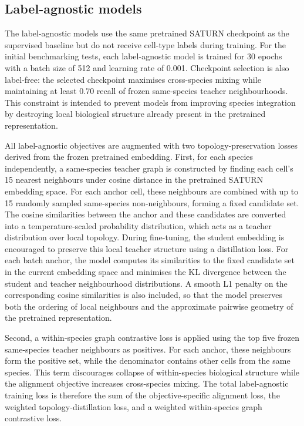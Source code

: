 \documentclass{article}
\begin{document}
\subsection{Label-agnostic models} \label{sec:models}
The label-agnostic models use the same pretrained SATURN checkpoint as the supervised baseline but do not receive cell-type labels during training. For the initial benchmarking tests, each label-agnostic model is trained for 30 epochs with a batch size of 512 and learning rate of 0.001. Checkpoint selection is also label-free: the selected checkpoint maximises cross-species mixing while maintaining at least 0.70 recall of frozen same-species teacher neighbourhoods. This constraint is intended to prevent models from improving species integration by destroying local biological structure already present in the pretrained representation.

All label-agnostic objectives are augmented with two topology-preservation losses derived from the frozen pretrained embedding. First, for each species independently, a same-species teacher graph is constructed by finding each cell's 15 nearest neighbours under cosine distance in the pretrained SATURN embedding space. For each anchor cell, these neighbours are combined with up to 15 randomly sampled same-species non-neighbours, forming a fixed candidate set. The cosine similarities between the anchor and these candidates are converted into a temperature-scaled probability distribution, which acts as a teacher distribution over local topology. During fine-tuning, the student embedding is encouraged to preserve this local teacher structure using a distillation loss. For each batch anchor, the model computes its similarities to the fixed candidate set in the current embedding space and minimises the KL divergence between the student and teacher neighbourhood distributions. A smooth L1 penalty on the corresponding cosine similarities is also included, so that the model preserves both the ordering of local neighbours and the approximate pairwise geometry of the pretrained representation.

Second, a within-species graph contrastive loss is applied using the top five frozen same-species teacher neighbours as positives. For each anchor, these neighbours form the positive set, while the denominator contains other cells from the same species. This term discourages collapse of within-species biological structure while the alignment objective increases cross-species mixing. The total label-agnostic training loss is therefore the sum of the objective-specific alignment loss, the weighted topology-distillation loss, and a weighted within-species graph contrastive loss.
\end{document}
